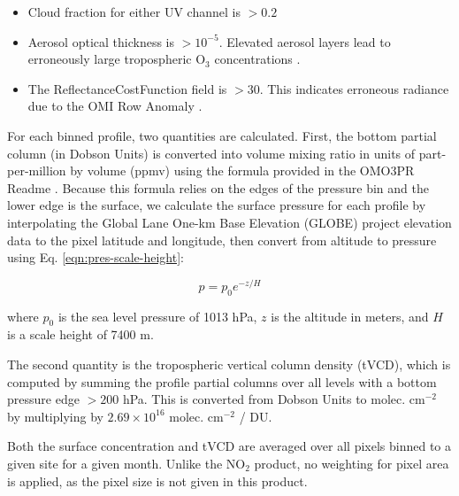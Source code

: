 \documentclass[a4paper,10pt,oneside]{article}
\newcommand{\ce}[1]{$\mathrm{#1}$}
\begin{document}
\begin{sloppy}
	\begin{itemize}
	\item Cloud fraction for either UV channel is $> 0.2$
	\item Aerosol optical thickness is $> 10^{-5}$. Elevated aerosol layers lead to erroneously large tropospheric \ce{O_3} concentrations \cite{omo3pr-readme}.
	\item The ReflectanceCostFunction field is $> 30$. This indicates erroneous radiance due to the OMI Row Anomaly \cite{row-anomaly}.
	\end{itemize}
	
	For each binned profile, two quantities are calculated. First, the bottom partial column (in Dobson Units) is converted into volume mixing ratio in units of part-per-million by volume (ppmv) using the formula provided in the OMO3PR Readme \cite{omo3pr-readme}. Because this formula relies on the edges of the pressure bin and the lower edge is the surface, we calculate the surface pressure for each profile by interpolating the Global Lane One-km Base Elevation (GLOBE) project elevation data \cite{globe} to the pixel latitude and longitude, then convert from altitude to pressure using Eq. \eqref{eqn:pres-scale-height}:
	
	\begin{equation}
	\label{eqn:pres-scale-height}
	p = p_0 e^{-z/H}
	\end{equation}
	
	where $p_0$ is the sea level pressure of 1013 hPa, $z$ is the altitude in meters, and $H$ is a scale height of 7400 m.
	
	The second quantity is the tropospheric vertical column density (tVCD), which is computed by summing the profile partial columns over all levels with a bottom pressure edge $> 200$ hPa. This is converted from Dobson Units to molec. cm$^{-2}$ by multiplying by $2.69 \times 10^{16}$
molec. cm$^{-2}$ / DU. 

	Both the surface concentration and tVCD are averaged over all pixels binned to a given site for a given month. Unlike the \ce{NO_2} product, no weighting for pixel area is applied, as the pixel size is not given in this product.
	 

\end{sloppy}
\end{document}
